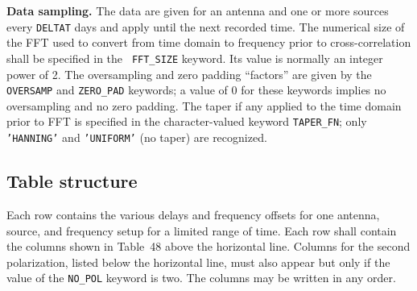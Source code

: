 \documentclass[twoside]{article}
\newcommand{\Me}[1]{\textcolor{mecol}{#1}}
\begin{document}
{\bf Data sampling.}  \Me{The data are given for an antenna and one or
more sources every {\tt DELTAT} days and apply until the next recorded
time.}  The numerical size of the FFT used to convert from time domain
to frequency prior to cross-correlation shall be specified in the {\tt
  FFT\_SIZE} keyword.  Its value is normally an integer power of 2.
The oversampling and zero padding ``factors'' are given by the {\tt
  OVERSAMP} and {\tt ZERO\_PAD} keywords; a value of 0 for these
keywords implies no oversampling and no zero padding.  The taper if
any applied to the time domain prior to FFT is specified in the
character-valued keyword {\tt TAPER\_FN}; only {\tt 'HANNING'} and
{\tt 'UNIFORM'} (no taper) are recognized.
\vfill\eject

\subsection{Table structure}

Each row contains the various delays and frequency offsets for one
antenna, source, and frequency setup for a limited range of time.
Each row shall contain the columns shown in Table~48 above the
horizontal line.  Columns for the second polarization, listed below
the horizontal line, must also appear but only if the value of the
{\tt NO\_POL} keyword is two.  The columns may be written in any
order.
\end{document}
